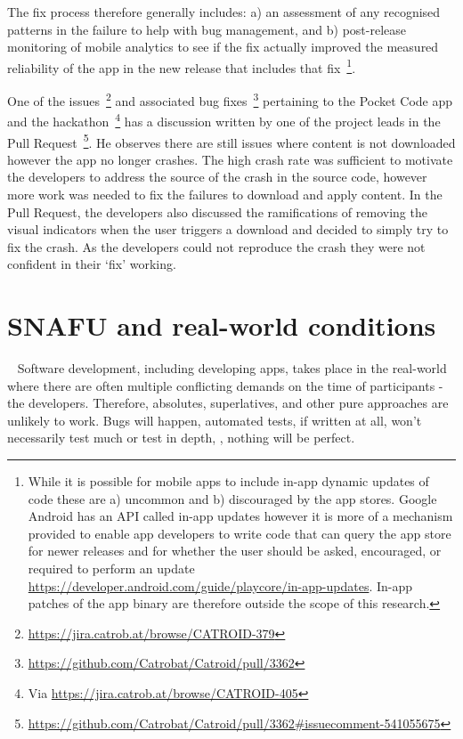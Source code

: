 The fix process therefore generally includes: a) an assessment of any recognised patterns in the failure to help with bug management, and b) post-release monitoring of mobile analytics to see if the fix actually improved the measured reliability of the app in the new release that includes that fix~\footnote{While it is possible for mobile apps to include in-app dynamic updates of code these are a) uncommon and b) discouraged by the app stores. Google Android has an API called in-app updates however it is more of a mechanism provided to enable app developers to write code that can query the app store for newer releases and for whether the user should be asked, encouraged, or required to perform an update %
\url{https://developer.android.com/guide/playcore/in-app-updates}. In-app patches of the app binary are therefore outside the scope of this research.}. 

One of the issues~\footnote{\url{https://jira.catrob.at/browse/CATROID-379}} and associated bug fixes~\footnote{\url{https://github.com/Catrobat/Catroid/pull/3362}} pertaining to the Pocket Code app and the hackathon~\footnote{Via \url{https://jira.catrob.at/browse/CATROID-405}} has a discussion written by one of the project leads in the Pull Request~\footnote{\url{https://github.com/Catrobat/Catroid/pull/3362\#issuecomment-541055675}}. 
He observes there are still issues where content is not downloaded however the app no longer crashes. The high crash rate was sufficient to motivate the developers to address the source of the crash in the source code, however more work was needed to fix the failures to download and apply content. In the Pull Request, the developers also discussed the ramifications of removing the visual indicators when the user triggers a download and decided to simply try to fix the crash. As the developers could not reproduce the crash they were not confident in their `fix' working.

\section{SNAFU and real-world conditions}~\label{aiu-snafu-and-real-world-conditions-section}
Software development, including developing apps, takes place in the real-world where there are often multiple conflicting demands on the time of participants - the developers. Therefore, absolutes, superlatives, and other pure approaches are unlikely to work. Bugs will happen, automated tests, if written at all, won't necessarily test much or test in depth, , nothing will be perfect.

